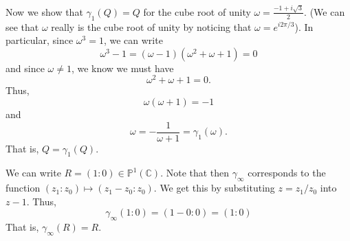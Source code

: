 \documentclass[12 pt, letterpaper]{hmcpset}
\begin{document}
\begin{solution}
\begin{enumerate}
			Now we show that $\gamma_{1}(Q) = Q$ for the cube root of unity $\omega = \frac{-1 + i \sqrt{3}}{2}$. (We can see that $\omega$ really is the cube root of unity by noticing that $\omega = e^{i 2 \pi /3}$). In particular, since $\omega^{3} = 1$, we can write
			\[
				\omega^{3} - 1 = (\omega - 1)(\omega^{2} + \omega + 1) = 0
			\]
			and since $\omega \neq 1$, we know we must have
			\[
				\omega^{2} + \omega + 1 = 0.
			\]
			Thus,
			\[
				\omega(\omega + 1) = -1
			\]
			and
			\[
				\omega = - \frac{1}{\omega + 1} = \gamma_{1}(\omega).
			\]
			That is, $Q = \gamma_{1}(Q)$.

			We can write $R = (1 : 0) \in \mathbb{P}^{1}(\mathbb{C})$. Note that then $\gamma_{\infty}$ corresponds to the function $(z_{1} : z_{0}) \mapsto (z_{1} - z_{0} : z_{0})$. We get this by substituting $z = z_{1} / z_{0}$ into $z - 1$. Thus,
			\[
				\gamma_{\infty}(1 : 0) = (1 - 0 : 0) = (1 : 0)
			\]
			That is, $\gamma_{\infty}(R) = R$.
	\end{enumerate}
\end{solution}

\pagebreak
\end{document}

